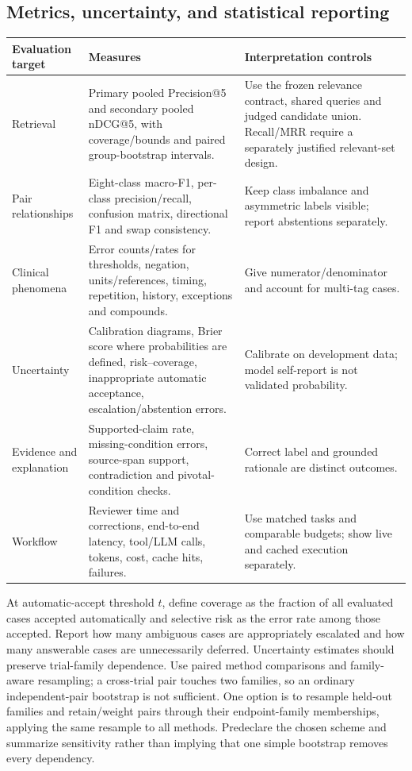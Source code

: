 \documentclass[10pt,letterpaper]{article}
\begin{document}
\subsection{Metrics, uncertainty, and statistical reporting}
\begin{longtable}{L{.22\linewidth}L{.40\linewidth}L{.29\linewidth}}
\toprule Evaluation target & Measures & Interpretation controls\\\midrule
\endhead
Retrieval & Primary pooled Precision@5 and secondary pooled nDCG@5, with coverage/bounds and paired group-bootstrap intervals. & Use the frozen relevance contract, shared queries and judged candidate union. Recall/MRR require a separately justified relevant-set design.\\
Pair relationships & Eight-class macro-F1, per-class precision/recall, confusion matrix, directional F1 and swap consistency. & Keep class imbalance and asymmetric labels visible; report abstentions separately.\\
Clinical phenomena & Error counts/rates for thresholds, negation, units/references, timing, repetition, history, exceptions and compounds. & Give numerator/denominator and account for multi-tag cases.\\
Uncertainty & Calibration diagrams, Brier score where probabilities are defined, risk--coverage, inappropriate automatic acceptance, escalation/abstention errors. & Calibrate on development data; model self-report is not validated probability.\\
Evidence and explanation & Supported-claim rate, missing-condition errors, source-span support, contradiction and pivotal-condition checks. & Correct label and grounded rationale are distinct outcomes.\\
Workflow & Reviewer time and corrections, end-to-end latency, tool/LLM calls, tokens, cost, cache hits, failures. & Use matched tasks and comparable budgets; show live and cached execution separately.\\\bottomrule
\end{longtable}

At automatic-accept threshold $t$, define coverage as the fraction of all
evaluated cases accepted automatically and selective risk as the error rate
among those accepted. Report how many ambiguous cases are appropriately
escalated and how many answerable cases are unnecessarily deferred.
Uncertainty estimates should preserve trial-family dependence. Use paired
method comparisons and family-aware resampling; a cross-trial pair touches
two families, so an ordinary independent-pair bootstrap is not sufficient.
One option is to resample held-out families and retain/weight pairs through
their endpoint-family memberships, applying the same resample to all methods.
Predeclare the chosen scheme and summarize sensitivity rather than implying
that one simple bootstrap removes every dependency.
\end{document}
